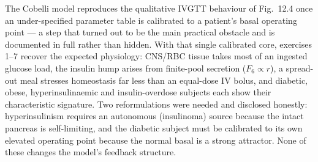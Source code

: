 The Cobelli model reproduces the qualitative IVGTT behaviour of Fig.~12.4 once an under-specified
parameter table is calibrated to a patient's basal operating point --- a step that turned out to be the
main practical obstacle and is documented in full rather than hidden. With that single calibrated core,
exercises 1--7 recover the expected physiology: CNS/RBC tissue takes most of an ingested glucose load,
the insulin hump arises from finite-pool secretion ($F_6\propto r$), a spread-out meal stresses
homeostasis far less than an equal-dose IV bolus, and diabetic, obese, hyperinsulinaemic and
insulin-overdose subjects each show their characteristic signature. Two reformulations were needed and
disclosed honestly: hyperinsulinism requires an autonomous (insulinoma) source because the intact
pancreas is self-limiting, and the diabetic subject must be calibrated to its own elevated operating
point because the normal basal is a strong attractor. None of these changes the model's feedback
structure.
